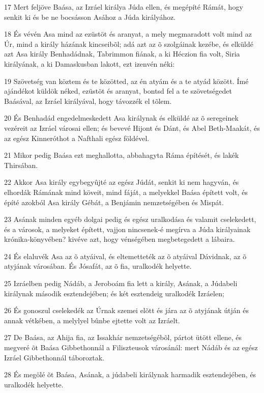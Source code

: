 \par 17 Mert feljöve Baása, az Izráel királya Júda ellen, és megépíté Rámát, hogy senkit ki és be ne bocsásson Asához a Júda királyához.
\par 18 És vévén Asa mind az ezüstöt és aranyat, a mely megmaradott volt mind az Úr, mind a király házának kincseibõl; adá azt az õ szolgáinak kezébe, és elküldé azt Asa király Benhadádnak, Tabrimmon fiának, a ki Héczion fia volt, Siria királyának, a ki Damaskusban lakott, ezt izenvén néki:
\par 19 Szövetség van köztem és te közötted, az én atyám és a te atyád között. Ímé ajándékot küldök néked, ezüstöt és aranyat, bontsd fel a te szövetségedet Baásával, az Izráel királyával, hogy távozzék el tõlem.
\par 20 És Benhadád engedelmeskedett Asa királynak és elküldé az õ seregeinek vezéreit az Izráel városai ellen; és bevevé Hijont és Dánt, és Abel Beth-Maakát, és az egész Kinneróthot a Nafthali egész földével.
\par 21 Mikor pedig Baása ezt meghallotta, abbahagyta Ráma építését, és lakék Thirsában.
\par 22 Akkor Asa király egybegyûjté az egész Júdát, senkit ki nem hagyván, és elhordák Rámának mind köveit, mind fáját, a melyekkel Baása épített volt, és építé azokból Asa király Gébát, a Benjámin nemzetségében és Mispát.
\par 23 Asának minden egyéb dolgai pedig és egész uralkodása és valamit cselekedett, és a városok, a melyeket épített, vajjon nincsenek-é megírva a Júda királyainak krónika-könyvében? kivéve azt, hogy vénségében megbetegedett a lábaira.
\par 24 És elaluvék Asa az õ atyáival, és eltemetteték az õ atyáival Dávidnak, az õ atyjának városában. És Jósafát, az õ fia, uralkodék helyette.
\par 25 Izráelben pedig Nádáb, a Jeroboám fia lett a király, Asának, a Júdabeli királynak második esztendejében; és két esztendeig uralkodék Izráelen;
\par 26 És gonoszul cselekedék az Úrnak szemei elõtt és jára az õ atyjának útján és annak vétkében, a melylyel bûnbe ejtette volt az Izráelt.
\par 27 De Baása, az Ahija fia, az Issakhár nemzetségébõl, pártot ütött ellene, és megveré õt Baása Gibbethonnál a Filiszteusok városánál: mert Nádáb és az egész Izráel Gibbethonnál táboroztak.
\par 28 És megölé õt Baása, Asának, a júdabeli királynak harmadik esztendejében, és uralkodék helyette.
